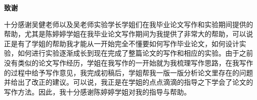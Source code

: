 \cleardoublepage{}
\begin{center}
    \bfseries {} 致谢
\end{center}

\par 十分感谢吴健老师以及吴老师实验学长学姐们在我毕业论文写作和实验期间提供的帮助，尤其是陈婷婷学姐在我毕业论文写作期间为我提供了非常大的帮助，可以说正是有了学姐的帮助我才能从一开始完全不懂要如何写作毕业论文，如何设计实验，如何进行实验逐渐成长到现在完成了整篇论文的写作和相应的实验。由于之前没有类似的论文写作经历，学姐在我写作的一开始就为我梳理写作思路，在我写作的过程中给予写作意见，我完成初稿后，学姐帮我一版一版分析论文里存在的问题并给出了改正的建议。可以说，我正是在学姐的点点滴滴的指导之下学会了论文的写作方法。因此，我十分感谢陈婷婷学姐对我的指导与帮助。
